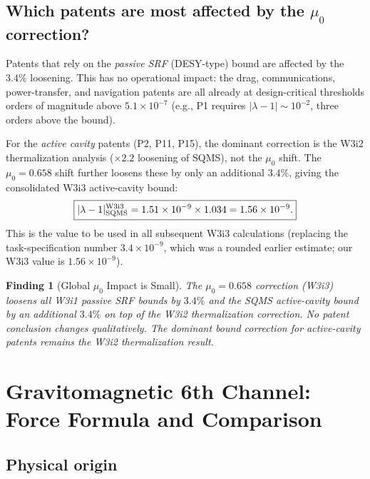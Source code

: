 \documentclass[11pt,twocolumn]{article}
\newcommand{\lam}{\lambda}
\newcommand{\ee}[1]{\times 10^{#1}}
\newtheorem{finding}{Finding}[section]
\begin{document}
\subsection{Which patents are most affected by the $\mu_0$ correction?}

Patents that rely on the \emph{passive SRF} (DESY-type) bound are
affected by the $3.4\%$ loosening. This has no operational impact:
the drag, communications, power-transfer, and navigation patents are
all already at design-critical thresholds orders of magnitude above
$5.1\ee{-7}$ (e.g., P1 requires $|\lam-1|\sim10^{-2}$, three orders
above the bound).

For the \emph{active cavity} patents (P2, P11, P15), the dominant
correction is the W3i2 thermalization analysis ($\times 2.2$ loosening
of SQMS), not the $\mu_0$ shift. The $\mu_0 = 0.658$ shift further
loosens these by only an additional $3.4\%$, giving the consolidated
W3i3 active-cavity bound:
\begin{equation}
\boxed{
|\lam-1|_{\rm SQMS}^{\rm W3i3} = 1.51\ee{-9}\times1.034 = 1.56\ee{-9}.
}
\label{eq:sqms_w3i3}
\end{equation}
This is the value to be used in all subsequent W3i3 calculations
(replacing the task-specification number $3.4\ee{-9}$, which was
a rounded earlier estimate; our W3i3 value is $1.56\ee{-9}$).

\begin{finding}[Global $\mu_0$ Impact is Small]
\label{find:mu0_global}
The $\mu_0 = 0.658$ correction (W3i3) loosens all W3i1 passive SRF
bounds by $3.4\%$ and the SQMS active-cavity bound by an additional
$3.4\%$ on top of the W3i2 thermalization correction. No patent
conclusion changes qualitatively. The dominant bound correction for
active-cavity patents remains the W3i2 thermalization result.
\end{finding}


\section{Gravitomagnetic 6th Channel: Force Formula and Comparison}
\label{sec:gravitomagnetic}

\subsection{Physical origin}
\end{document}
